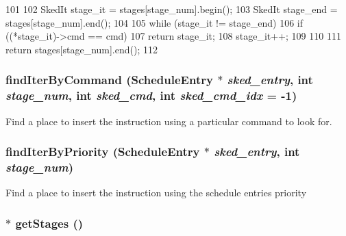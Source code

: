 \begin{DoxyCode}
101 {
102     SkedIt stage_it = stages[stage_num].begin();
103     SkedIt stage_end = stages[stage_num].end();
104 
105     while (stage_it != stage_end) {
106         if ((*stage_it)->cmd == cmd)
107             return stage_it;
108         stage_it++;
109     }
110 
111     return stages[stage_num].end();
112 }
\end{DoxyCode}
\hypertarget{classResourceSked_a0227e29ef6102c3bf012bd8ef5b53b88}{
\subsubsection[{findIterByCommand}]{ findIterByCommand ({\bf ScheduleEntry} $\ast$ {\em sked\_\-entry}, \/  int {\em stage\_\-num}, \/  int {\em sked\_\-cmd}, \/  int {\em sked\_\-cmd\_\-idx} = {\ttfamily -\/1})}}
\label{classResourceSked_a0227e29ef6102c3bf012bd8ef5b53b88}
Find a place to insert the instruction using a particular command to look for. \hypertarget{classResourceSked_ae8e8d099790bc4d1c165f44c4cc031e3}{
\subsubsection[{findIterByPriority}]{ findIterByPriority ({\bf ScheduleEntry} $\ast$ {\em sked\_\-entry}, \/  int {\em stage\_\-num})}}
\label{classResourceSked_ae8e8d099790bc4d1c165f44c4cc031e3}
Find a place to insert the instruction using the schedule entries priority \hypertarget{classResourceSked_acea7e9a7691586cc080fd9872992fd61}{
\subsubsection[{getStages}]{$\ast$ getStages ()}}
\label{classResourceSked_acea7e9a7691586cc080fd9872992fd61}




